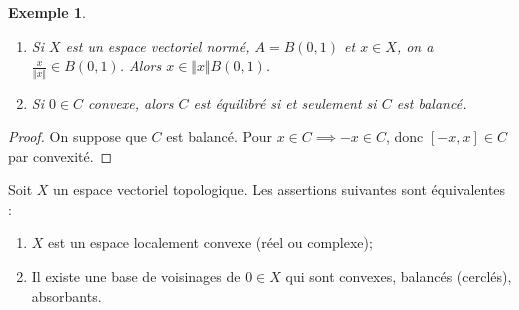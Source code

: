 \documentclass[french]{book}
\newtheorem{exemple}{Exemple}
\begin{document}
\begin{exemple}
  \begin{enumerate}
    \item Si $X$ est un espace vectoriel normé, $A = B(0, 1)$ et $x \in X$, on a $\frac{x}{\Vert x \Vert } \in B(0, 1)$. Alors $x \in \Vert x \Vert B(0, 1)$.
    \item Si $0 \in C$ convexe, alors $C$ est équilibré si et seulement si $C$ est balancé.
  \end{enumerate}
\end{exemple}


\begin{proof}
  On suppose que $C$ est balancé. Pour $x \in C \implies -x \in C$, donc $[-x, x] \in C$ par convexité.
\end{proof}

\begin{thm}\label{convexes-balances}
  Soit $X$ un espace vectoriel topologique. Les assertions suivantes sont équivalentes :

  \begin{enumerate}
    \item $X$ est un espace localement convexe (réel ou complexe);
    \item Il existe une base de voisinages de $0 \in X$ qui sont convexes, balancés (cerclés), absorbants.
  \end{enumerate}
\end{thm}

\end{document}

